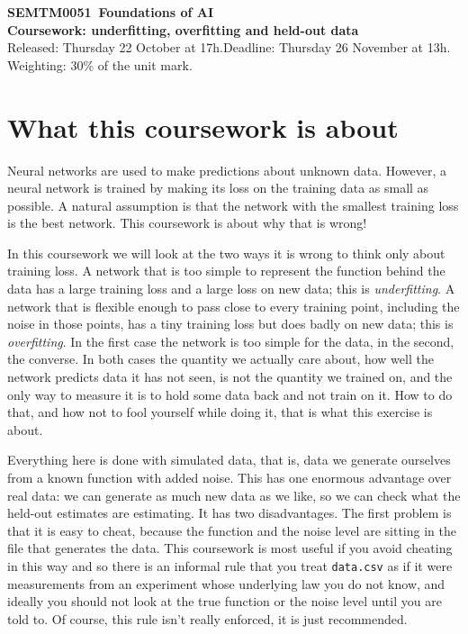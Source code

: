 \documentclass[11pt,a4paper]{article}
\newcommand{\unitcode}{SEMTM0051}
\newcommand{\unittitle}{Foundations of AI}
\newcommand{\cwtitle}{Coursework: underfitting, overfitting and held-out data}
\newcommand{\released}{Thursday 22 October at 17h}
\newcommand{\deadline}{Thursday 26 November at 13h}
\newcommand{\weighting}{30\% of the unit mark}
\newcounter{exercise}
\begin{document}
\begin{center}
{\Large\textbf{\unitcode\ \unittitle}}\\[0.5em]
{\Large\textbf{\cwtitle}}\\[1em]
Released: \released.\quad Deadline: \deadline. \\ Weighting: \weighting.
\end{center}

\section*{What this coursework is about}


Neural networks are used to make predictions about unknown
data. However, a neural network is trained by making its loss on the
training data as small as possible. A natural assumption is that the
network with the smallest training loss is the best network. This coursework is about
why that is wrong!

In this coursework we will look at the two ways it is wrong to think
only about training loss. A network that is too simple to represent
the function behind the data has a large training loss and a large
loss on new data; this is \emph{underfitting}. A network that is
flexible enough to pass close to every training point, including the
noise in those points, has a tiny training loss but does badly on new
data; this is \emph{overfitting}. In the first case the network is too
simple for the data, in the second, the converse. In both cases the
quantity we actually care about, how well the network predicts data it
has not seen, is not the quantity we trained on, and the only way to
measure it is to hold some data back and not train on it. How to do
that, and how not to fool yourself while doing it, that is what this
exercise is about.

Everything here is done with simulated data, that is, data we generate
ourselves from a known function with added noise. This has one
enormous advantage over real data: we can generate as much new data as
we like, so we can check what the held-out estimates are
estimating. It has two disadvantages. The first problem is that it is
easy to cheat, because the function and the noise level are sitting in
the file that generates the data. This coursework is most useful if
you avoid cheating in this way and so there is an informal rule that
you treat \texttt{data.csv} as if it were measurements from an
experiment whose underlying law you do not know, and ideally you
should not look at the true function or the noise level until you are
told to. Of course, this rule isn't really enforced, it is just
recommended.
\end{document}
